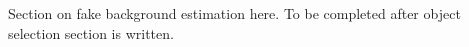 
Section on fake background estimation here. To be completed after
object selection section is written.
